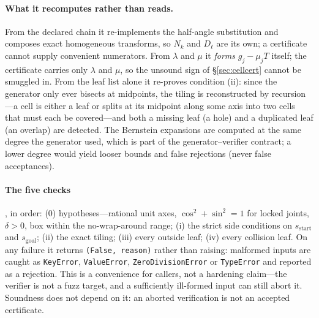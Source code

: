 \documentclass[10pt,twocolumn,letterpaper]{article}
\begin{document}
\paragraph{What it recomputes rather than reads.} From the declared chain it re-implements the half-angle substitution and composes exact homogeneous transforms, so $N_k$ and $D_\ell$ are its own; a certificate cannot supply convenient numerators. From $\lambda$ and $\mu$ it \emph{forms} $g_j-\mu_jT$ itself; the certificate carries only $\lambda$ and $\mu$, so the unsound sign of \S\ref{sec:cellcert} cannot be smuggled in. From the leaf list alone it re-proves condition (ii): since the generator only ever bisects at midpoints, the tiling is reconstructed by recursion---a cell is either a leaf or splits at its midpoint along some axis into two cells that must each be covered---and both a missing leaf (a hole) and a duplicated leaf (an overlap) are detected. The Bernstein expansions are computed at the same degree the generator used, which is part of the generator--verifier contract; a lower degree would yield looser bounds and false rejections (never false acceptances).

\paragraph{The five checks}, in order: (0) hypotheses---rational unit axes, $\cos^2+\sin^2=1$ for locked joints, $\delta>0$, box within the no-wrap-around range; (i) the strict side conditions on $s_{\mathrm{start}}$ and $s_{\mathrm{goal}}$; (ii) the exact tiling; (iii) every outside leaf; (iv) every collision leaf. On any failure it returns \texttt{(False, reason)} rather than raising: malformed inputs are caught as \texttt{KeyError}, \texttt{ValueError}, \texttt{ZeroDivisionError} or \texttt{TypeError} and reported as a rejection. This is a convenience for callers, not a hardening claim---the verifier is not a fuzz target, and a sufficiently ill-formed input can still abort it. Soundness does not depend on it: an aborted verification is not an accepted certificate.
\end{document}
